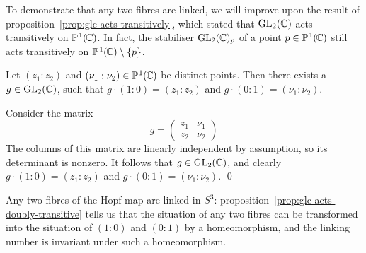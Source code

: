 To demonstrate that any two fibres are linked,
we will improve upon the result of proposition~\ref{prop:glc-acts-transitively},
which stated that $\operatorname{GL}_2(\mathbb{C})$ acts transitively on $\mathbb{P}^{\hspace{0.8pt}1}\hspace{-0.3pt}(\hspace{-0.7pt}\mathbb{C}\hspace{-0.3pt})$.
In fact, the stabiliser $\operatorname{GL}_2(\mathbb{C})_p$ of a point $p \in \mathbb{P}^{\hspace{0.8pt}1}\hspace{-0.3pt}(\hspace{-0.7pt}\mathbb{C}\hspace{-0.3pt})$
still acts transitively on $\mathbb{P}^{\hspace{0.8pt}1}\hspace{-0.3pt}(\hspace{-0.7pt}\mathbb{C}\hspace{-0.3pt}) \setminus \{ p \}$.

Let $(z_1 : z_2)$ and $(\nu_1 : \nu_2) \in \mathbb{P}^{\hspace{0.8pt}1}\hspace{-0.3pt}(\hspace{-0.7pt}\mathbb{C}\hspace{-0.3pt})$ be distinct points.
Then there exists a $g \in \operatorname{GL}_2(\mathbb{C})$,
such that $g \cdot (1 : 0) = (z_1 : z_2)$ and $g \cdot (0 : 1) = (\nu_1 : \nu_2)$.

\proof
Consider the matrix
\[ g = \begin{pmatrix}z_1 & \nu_1 \\ z_2 & \nu_2 \end{pmatrix} \]
The columns of this matrix are linearly independent by assumption,
so its determinant is nonzero.
It follows that $g \in \operatorname{GL}_2(\mathbb{C})$,
and clearly $g \cdot (1 : 0) = (z_1 : z_2)$
and $g \cdot (0 : 1) = (\nu_1 : \nu_2)$.
\qed

\corollary
Any two fibres of the Hopf map are linked in $S^3$:
proposition~\ref{prop:glc-acts-doubly-transitive} tells us that the situation
of any two fibres can be transformed into the situation of $(1 : 0)$ and $(0 : 1)$
by a homeomorphism,
and the linking number is invariant under such a homeomorphism.

